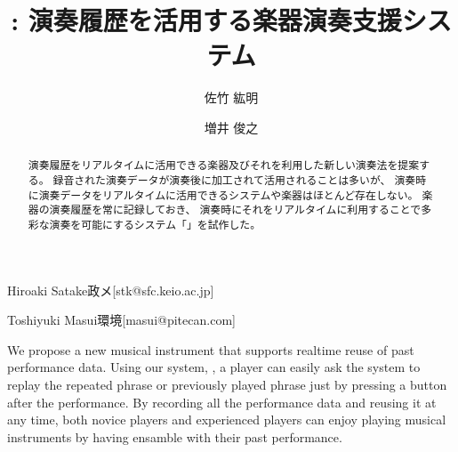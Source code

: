 \documentclass[submit,techreq]{ec2017}
\begin{document}
\title{{\system}: 演奏履歴を活用する楽器演奏支援システム}


  
\author{佐竹 紘明}{Hiroaki Satake}{政メ}[stk@sfc.keio.ac.jp]
\author{増井 俊之}{Toshiyuki Masui}{環境}[masui@pitecan.com]

\begin{abstract} %
  
  演奏履歴をリアルタイムに活用できる楽器及びそれを利用した新しい演奏法を提案する。
  録音された演奏データが演奏後に加工されて活用されることは多いが、
  演奏時に演奏データをリアルタイムに活用できるシステムや楽器はほとんど存在しない。
  楽器の演奏履歴を常に記録しておき、
  演奏時にそれをリアルタイムに利用することで多彩な演奏を可能にするシステム「{\system}」を試作した。
  
\end{abstract}


\begin{eabstract}

  We propose a new musical instrument that supports realtime reuse of
  past performance data.
  Using our system, \textit{\system},
  a player can easily ask the system to replay the repeated phrase or
  previously played phrase just by pressing a button after the performance.
  By recording all the performance data and reusing it at any time,
  both novice players and experienced players can enjoy playing musical instruments
  by having ensamble with their past performance.
  
\end{eabstract}


\maketitle










\end{document}

